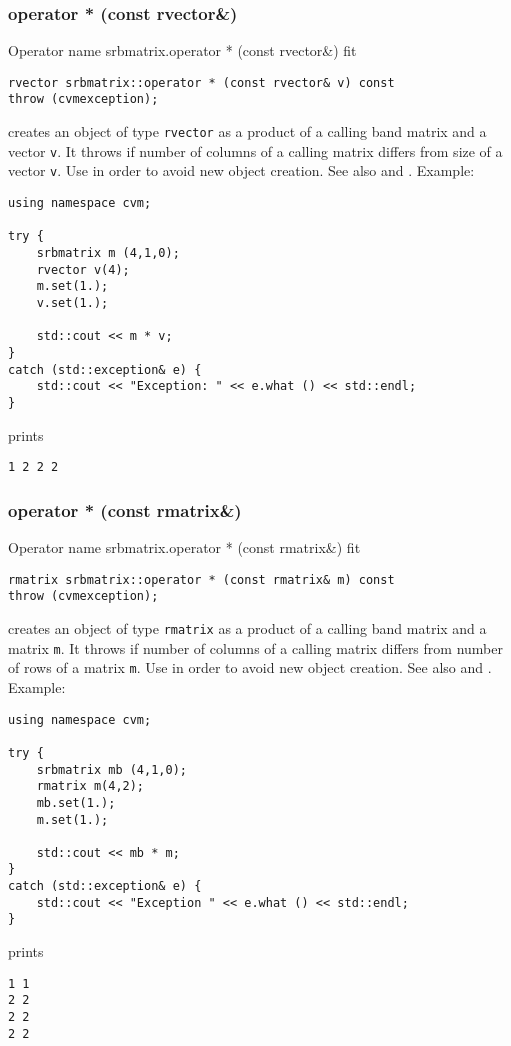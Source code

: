 \subsubsection{operator * (const rvector\&)}
Operator%
\pdfdest name {srbmatrix.operator * (const rvector&)} fit
\begin{verbatim}
rvector srbmatrix::operator * (const rvector& v) const
throw (cvmexception);
\end{verbatim}
creates an object of type \verb"rvector"
as a product of a calling band matrix and a vector \verb"v".
It throws  
if number of columns of a calling matrix
differs from  size of a vector \verb"v".
Use 
in order to avoid new object creation.
See also
 and .
Example:
\begin{Verbatim}
using namespace cvm;

try {
    srbmatrix m (4,1,0);
    rvector v(4);
    m.set(1.);
    v.set(1.);

    std::cout << m * v;
}
catch (std::exception& e) {
    std::cout << "Exception: " << e.what () << std::endl;
}
\end{Verbatim}
prints
\begin{Verbatim}
1 2 2 2
\end{Verbatim}
\newpage



\subsubsection{operator * (const rmatrix\&)}
Operator%
\pdfdest name {srbmatrix.operator * (const rmatrix&)} fit
\begin{verbatim}
rmatrix srbmatrix::operator * (const rmatrix& m) const
throw (cvmexception);
\end{verbatim}
creates an object of type \verb"rmatrix"
as a product of a calling band matrix and a matrix \verb"m".
It throws  
if  number of columns of a calling matrix
differs from  number of rows of a matrix \verb"m".
Use  in order to avoid
 new object creation.
See also
 and .
Example:
\begin{Verbatim}
using namespace cvm;

try {
    srbmatrix mb (4,1,0);
    rmatrix m(4,2);
    mb.set(1.);
    m.set(1.);

    std::cout << mb * m;
}
catch (std::exception& e) {
    std::cout << "Exception " << e.what () << std::endl;
}
\end{Verbatim}
prints
\begin{Verbatim}
1 1
2 2
2 2
2 2
\end{Verbatim}
\newpage




